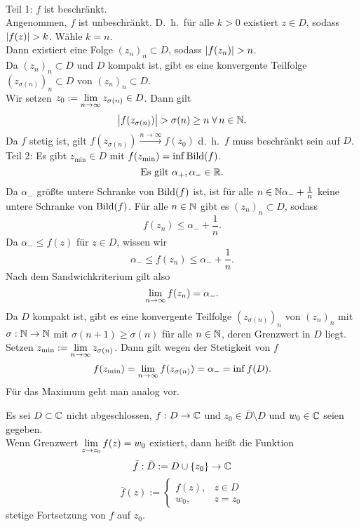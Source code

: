 \documentclass[../ana1.tex]{subfiles}
\begin{document}
\begin{bew}\leavevmode \\
    Teil 1: \(f\) ist beschränkt.\\
    Angenommen, \(f\) ist unbeschränkt. D.\ h.\ für 
    alle \( k>0 \) existiert \( z\in D \), sodass
    \( \left|f(z)\right| > k \). Wähle \( k=n \). \\
    Dann existiert eine Folge \( {(z_n)}_n \subset D \),
    sodass \( \left|f(z_n)\right| > n \).\\
    Da \( {(z_n)}_n \subset D \) und \(D\) kompakt ist, 
    gibt es eine konvergente Teilfolge 
    \( {(z_{\sigma(n)})}_n \subset D \) von 
    \( {(z_n)}_n \subset D \).\\
    Wir setzen \( z_0 := \lim\limits_{n\rightarrow\infty} z_{\sigma(n)} 
    \in D \). Dann gilt 
    \[ \left|f(z_{\sigma(n)})\right| > \sigma(n) \geq n 
    \;\forall \, n\in\mathbb{N}. \]
    Da \(f\) stetig ist, gilt \( f(z_{\sigma(n)}) 
    \overset{n\rightarrow\infty}{\longrightarrow}
    f(z_0) \) \Lightning{} d.\ h.\  \(f\) muss 
    beschränkt sein auf \(D\).\\
    Teil 2: Es gibt \( z_{\min} \in D \) mit 
    \( f(z_{\min}) = \inf \operatorname{Bild}(f) \).\\
    \[ \text{Es gilt } \alpha_+, \alpha_{\minus} 
    \in \R .\]
    Da \( \alpha_{\minus} \) größte untere Schranke 
    von \( \operatorname{Bild}(f) \) ist, ist für alle \( n\in\N 
    \alpha_{\minus} + \frac{1}{n} \) keine untere 
    Schranke von \( \operatorname{Bild}(f) \). Für alle 
    \( n\in\mathbb{N} \) gibt es \( {(z_n)}_n \subset D \), 
    sodass 
    \[ f(z_n) \leq \alpha_{\minus} + \frac{1}{n}. \]
    Da \( \alpha_{\minus} \leq f(z) \) für 
    \( z\in D \), wissen wir
    \[ \alpha_{\minus} \leq f(z_n) \leq 
    \alpha_{\minus} + \frac{1}{n}. \]
    Nach dem Sandwichkriterium gilt also 
    \[ \limes{n} f(z_n) = \alpha_{\minus}. \]
    Da \(D\) kompakt ist, gibt es eine konvergente 
    Teilfolge \( {(z_{\sigma(n)})}_n \) von 
    \( {(z_n)}_n \) mit \( \sigma : \mathbb{N} 
    \rightarrow \mathbb{N} \) mit \( \sigma(n+1) \geq 
    \sigma(n) \) für alle \( n\in\mathbb{N} \), deren Grenzwert 
    in \(D\) liegt.\\
    Setzen \( z_{\min} := \lim\limits_{n\rightarrow\infty} z_{\sigma(n)} \). 
    Dann gilt wegen der Stetigkeit von \(f\)
    \[ f(z_{\min}) = \limes{n} f(z_{\sigma(n)}) 
    = \alpha_{\minus} = \inf f(D). \]
    Für das Maximum geht man analog vor.
\end{bew}
\begin{defi}
    Es sei \( D \subset \mathbb{C} \) nicht abgeschlossen, 
    \( f: D\rightarrow \mathbb{C} \) und \( z_0 \in \bar{D}
    \setminus D \) und \( w_0 \in \mathbb{C} \) seien gegeben.\\
    Wenn Grenzwert \( \lim\limits_{z\rightarrow z_0} f(z) = w_0 \)
    existiert, dann heißt die Funktion 
    \[ \bar{f} : \bar{D} := D \cup \{z_0\} 
    \rightarrow \mathbb{C} \]
    \[ \bar{f}(z) := 
    \begin{cases}
        f(z), &z\in D \\
        w_0, &z = z_0
    \end{cases} \]
    stetige Fortsetzung von \(f\) auf \(z_0\).
\end{defi}
\end{document}
